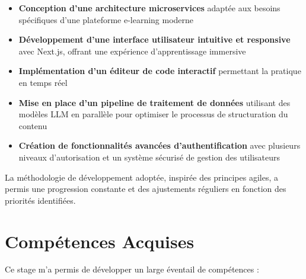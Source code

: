 \documentclass[12pt, a4paper]{report}
\begin{document}
\begin{itemize}
  \item \textbf{Conception d'une architecture microservices} adaptée aux besoins spécifiques d'une plateforme e-learning moderne
  \item \textbf{Développement d'une interface utilisateur intuitive et responsive} avec Next.js, offrant une expérience d'apprentissage immersive
  \item \textbf{Implémentation d'un éditeur de code interactif} permettant la pratique en temps réel
  \item \textbf{Mise en place d'un pipeline de traitement de données} utilisant des modèles LLM en parallèle pour optimiser le processus de structuration du contenu
  \item \textbf{Création de fonctionnalités avancées d'authentification} avec plusieurs niveaux d'autorisation et un système sécurisé de gestion des utilisateurs
\end{itemize}

La méthodologie de développement adoptée, inspirée des principes agiles, a permis une progression constante et des ajustements réguliers en fonction des priorités identifiées.

\section{Compétences Acquises}

Ce stage m'a permis de développer un large éventail de compétences :
\end{document}
